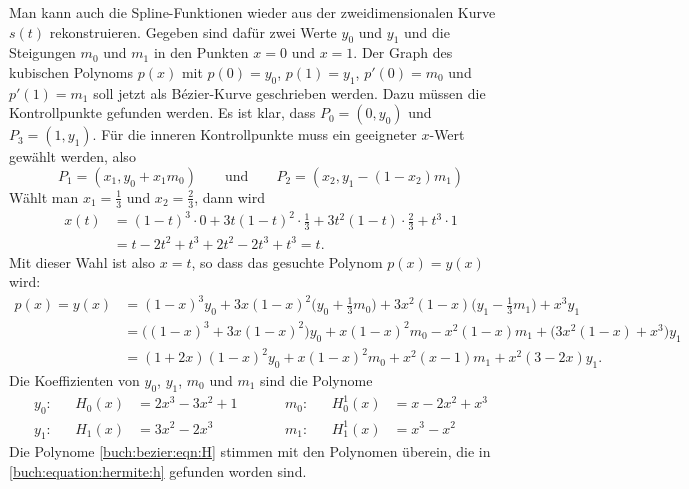Man kann auch die Spline-Funktionen wieder aus der zweidimensionalen
Kurve $s(t)$ rekonstruieren.
Gegeben sind dafür zwei Werte $y_0$ und $y_1$ und die Steigungen $m_0$ und
$m_1$ in den Punkten $x=0$ und $x=1$.
Der Graph des kubischen Polynoms $p(x)$ mit $p(0)=y_0$, $p(1)=y_1$,
$p'(0)=m_0$ und $p'(1)=m_1$ soll jetzt als Bézier-Kurve geschrieben werden.
Dazu müssen die Kontrollpunkte gefunden werden.
Es ist klar, dass $P_0=(0,y_0)$ und $P_3=(1,y_1)$.
Für die inneren Kontrollpunkte muss ein geeigneter $x$-Wert gewählt werden,
also
\[
P_1=
(x_1,y_0+x_1m_0)
\qquad
\text{und}
\qquad
P_2
=
(x_2,y_1-(1-x_2)m_1)
\]
Wählt man $x_1=\frac13$ und $x_2=\frac23$, dann wird
\begin{align*}
x(t)
&=
(1-t)^3\cdot 0 + 3t(1-t)^2\cdot \frac13 + 3t^2(1-t)\cdot \frac23 + t^3\cdot 1
\\
&=
t-2t^2+t^3 + 2t^2 -2t^3 + t^3 = t.
\end{align*}
Mit dieser Wahl ist also $x=t$, so dass das gesuchte Polynom $p(x)=y(x)$ wird:
\begin{align*}
p(x)
=
y(x)
&=
(1-x)^3 y_0
+
3x(1-x)^2\biggl(y_0+\frac13m_0\biggr)
+
3x^2(1-x) \biggl(y_1-\frac13m_1\biggr)
+
x^3 y_1
\\
&=
\bigl((1-x)^3+3x(1-x)^2\bigr)
y_0
+
x(1-x)^2 m_0
-
x^2(1-x) m_1
+
\bigl(3x^2(1-x)+x^3\bigr)
y_1
\\
&=
(1+2x)(1-x)^2 y_0
+
x(1-x)^2 m_0
+
x^2(x-1) m_1
+
x^2(3-2x) y_1.
\end{align*}
Die Koeffizienten von $y_0$, $y_1$, $m_0$ und $m_1$ sind die Polynome
\begin{equation}
\begin{aligned}
y_0:&&
H_0(x)
&=
2x^3-3x^2+1
&\quad&
&m_0:&&
H_0^1(x)
&=
x-2x^2+x^3
\\
y_1:&&
H_1(x)
&=
3x^2-2x^3
&\quad&
&m_1:&&
H_1^1(x)
&=
x^3-x^2
\end{aligned}
\label{buch:bezier:eqn:H}
\end{equation}
Die Polynome \eqref{buch:bezier:eqn:H} stimmen mit den Polynomen überein,
die in \eqref{buch:equation:hermite:h} gefunden worden sind.



